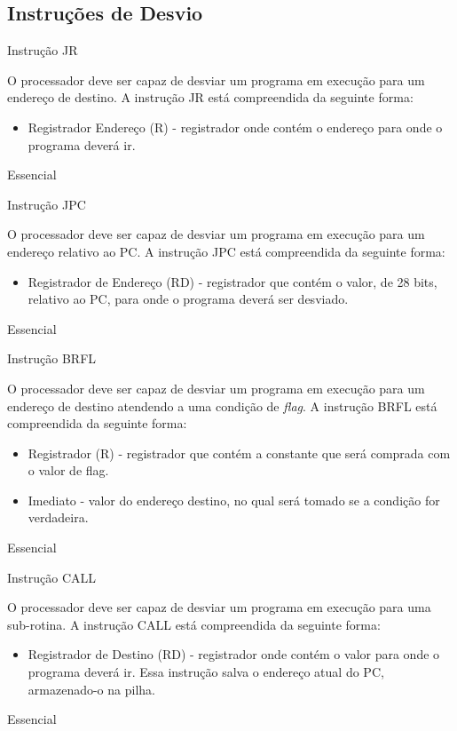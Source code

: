 \documentclass{article}
\begin{document}
    \subsection{Instruções de Desvio}

    \begin{functional}
      \requirement
      {Instrução JR}
      {O processador deve ser capaz de desviar um programa em execução para um endereço de destino.
      A instrução JR está compreendida da seguinte forma:\\
       \begin{itemize}
         \item Registrador Endereço (R) - registrador onde contém o endereço para onde o programa deverá ir.
         \end{itemize}
         }
      {Essencial}

      \requirement
      {Instrução JPC}
      {O processador deve ser capaz de desviar um programa em execução para um endereço relativo ao PC.
      A instrução JPC está compreendida da seguinte forma:\\
       \begin{itemize}
         \item Registrador de Endereço (RD) - registrador que contém o valor, de 28 bits, relativo ao PC, para onde o programa deverá ser desviado.
         \end{itemize}
         }
      {Essencial}

      \requirement
      {Instrução BRFL}
      {O processador deve ser capaz de desviar um programa em execução para um endereço de destino atendendo a uma condição de \textit{flag}.
      A instrução BRFL está compreendida da seguinte forma:\\
       \begin{itemize}
         \item Registrador (R) - registrador que contém a constante que será comprada com o valor de flag.
         \item Imediato - valor do endereço destino, no qual será tomado se a condição for verdadeira.
         \end{itemize}
         }
      {Essencial}

      \requirement
      {Instrução CALL}
      {O processador deve ser capaz de desviar um programa em execução para uma sub-rotina.
      A instrução CALL está compreendida da seguinte forma:\\
       \begin{itemize}
         \item Registrador de Destino (RD) - registrador onde contém o valor para onde o programa deverá ir. Essa instrução salva o endereço atual do PC, armazenado-o na pilha.
        \end{itemize}
        }
      {Essencial}


\end{functional}
\end{document}
